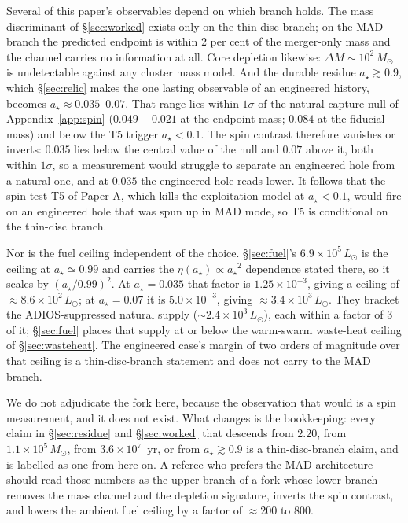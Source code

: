 \documentclass[11pt]{article}
\newcommand{\msun}{\ensuremath{M_\odot}}
\newcommand{\astar}{\ensuremath{a_\star}}
\begin{document}
Several of this paper's observables depend on which branch holds. The mass discriminant of \S\ref{sec:worked} exists only on the thin-disc branch; on the MAD branch the predicted endpoint is within $2$ per cent of the merger-only mass and the channel carries no information at all. Core depletion likewise: $\Delta M \sim 10^{2}\,\msun$ is undetectable against any cluster mass model. And the durable residue $\astar \gtrsim 0.9$, which \S\ref{sec:relic} makes the one lasting observable of an engineered history, becomes $\astar \approx 0.035$--$0.07$. That range lies within $1\sigma$ of the natural-capture null of Appendix~\ref{app:spin} ($0.049 \pm 0.021$ at the endpoint mass; $0.084$ at the fiducial mass) and below the T5 trigger $\astar < 0.1$. The spin contrast therefore vanishes or inverts: $0.035$ lies below the central value of the null and $0.07$ above it, both within $1\sigma$, so a measurement would struggle to separate an engineered hole from a natural one, and at $0.035$ the engineered hole reads lower. It follows that the spin test T5 of Paper A, which kills the exploitation model at $\astar < 0.1$, would fire on an engineered hole that was spun up in MAD mode, so T5 is conditional on the thin-disc branch.

Nor is the fuel ceiling independent of the choice. \S\ref{sec:fuel}'s $6.9\times10^{5}\,L_{\odot}$ is the ceiling at $\astar \simeq 0.99$ and carries the $\eta(\astar) \propto \astar^{2}$ dependence stated there, so it scales by $(\astar/0.99)^{2}$. At $\astar = 0.035$ that factor is $1.25\times10^{-3}$, giving a ceiling of $\approx 8.6\times10^{2}\,L_{\odot}$; at $\astar = 0.07$ it is $5.0\times10^{-3}$, giving $\approx 3.4\times10^{3}\,L_{\odot}$. They bracket the ADIOS-suppressed natural supply ($\sim 2.4\times10^{3}\,L_{\odot}$), each within a factor of 3 of it; \S\ref{sec:fuel} places that supply at or below the warm-swarm waste-heat ceiling of \S\ref{sec:wasteheat}. The engineered case's margin of two orders of magnitude over that ceiling is a thin-disc-branch statement and does not carry to the MAD branch.

We do not adjudicate the fork here, because the observation that would is a spin measurement, and it does not exist. What changes is the bookkeeping: every claim in \S\ref{sec:residue} and \S\ref{sec:worked} that descends from $2.20$, from $1.1\times10^{5}\,\msun$, from $3.6\times10^{7}$~yr, or from $\astar \gtrsim 0.9$ is a thin-disc-branch claim, and is labelled as one from here on. A referee who prefers the MAD architecture should read those numbers as the upper branch of a fork whose lower branch removes the mass channel and the depletion signature, inverts the spin contrast, and lowers the ambient fuel ceiling by a factor of $\approx 200$ to $800$.
\end{document}

